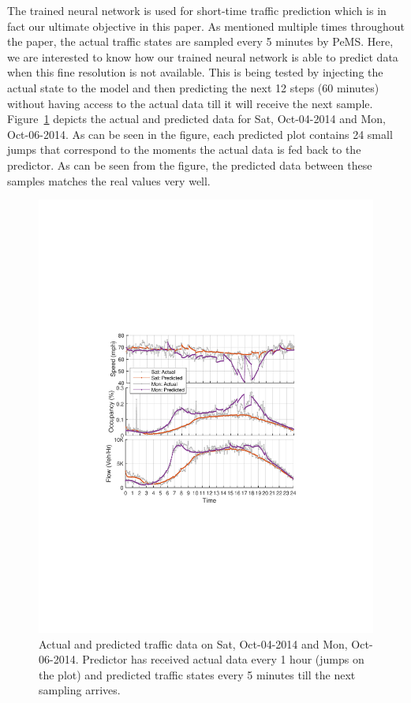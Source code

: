 \documentclass[twocolumn,10pt]{asme2e}
\begin{document}
The trained neural network is used for short-time traffic prediction which is in fact our ultimate objective in this paper. As mentioned multiple times throughout the paper, the actual traffic states are sampled every 5 minutes by PeMS. Here, we are interested to know how our trained neural network is able to predict data when this fine resolution is not available. This is being tested by injecting the actual state to the model and then predicting the next 12 steps (60 minutes) without having access to the actual data till it will receive the next sample. Figure~\ref{fig:final1} depicts the actual and predicted data for Sat, Oct-04-2014 and Mon, Oct-06-2014. As can be seen in the figure, each predicted plot contains 24 small jumps that correspond to the moments the actual data is fed back to the predictor. As can be seen from the figure, the predicted data between these samples matches the real values very well.
\begin{figure}[t]
	\centering
	\includegraphics[width=1\linewidth]{./Figures/final1}
	\caption{Actual and predicted traffic data on Sat, Oct-04-2014 and Mon, Oct-06-2014. Predictor has received actual data every 1 hour (jumps on the plot) and predicted traffic states every 5 minutes till the next sampling arrives.}
	\label{fig:final1}
\end{figure}
\end{document}
